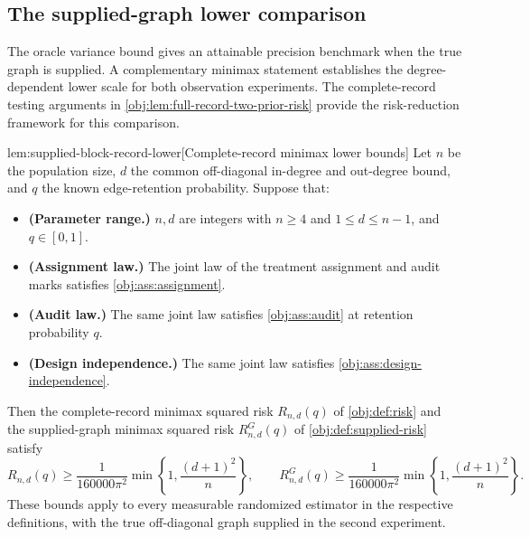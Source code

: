 \documentclass[11pt]{article}
\begin{document}
\subsection{The supplied-graph lower comparison}

The oracle variance bound gives an attainable precision benchmark when the true graph is supplied. A complementary minimax statement establishes the degree-dependent lower scale for both observation experiments. The complete-record testing arguments in \cref{obj:lem:full-record-two-prior-risk} provide the risk-reduction framework for this comparison.

\begin{lemmav}{lem:supplied-block-record-lower}[Complete-record minimax lower bounds]
Let \(n\) be the population size, \(d\) the common off-diagonal in-degree and out-degree bound, and \(q\) the known edge-retention probability. Suppose that:
\begin{itemize}
\item \textbf{(Parameter range.)} \(n,d\) are integers with \(n\ge4\) and \(1\le d\le n-1\), and \(q\in[0,1]\).
\item \textbf{(Assignment law.)} The joint law of the treatment assignment and audit marks satisfies \cref{obj:ass:assignment}.
\item \textbf{(Audit law.)} The same joint law satisfies \cref{obj:ass:audit} at retention probability \(q\).
\item \textbf{(Design independence.)} The same joint law satisfies \cref{obj:ass:design-independence}.
\end{itemize}
Then the complete-record minimax squared risk \(R_{n,d}(q)\) of \cref{obj:def:risk} and the supplied-graph minimax squared risk \(R^G_{n,d}(q)\) of \cref{obj:def:supplied-risk} satisfy
\[
R_{n,d}(q)\ge
\frac{1}{160000\pi^2}
\min\left\{1,\frac{(d+1)^2}{n}\right\},
\qquad
R^G_{n,d}(q)\ge
\frac{1}{160000\pi^2}
\min\left\{1,\frac{(d+1)^2}{n}\right\}.
\]
These bounds apply to every measurable randomized estimator in the respective definitions, with the true off-diagonal graph supplied in the second experiment.
\end{lemmav}
\end{document}
